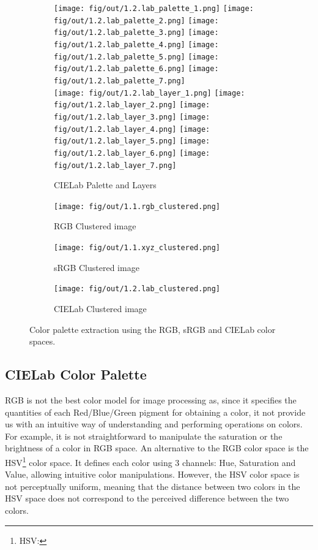 \documentclass[tikz,14pt,fleqn]{article}
\begin{document}
\begin{figure}[h!]
    \begin{subfigure}[]{\linewidth}
        \centering
        \texttt{[image: fig/out/1.2.lab\_palette\_1.png]}
        \texttt{[image: fig/out/1.2.lab\_palette\_2.png]}
        \texttt{[image: fig/out/1.2.lab\_palette\_3.png]}
        \texttt{[image: fig/out/1.2.lab\_palette\_4.png]}
        \texttt{[image: fig/out/1.2.lab\_palette\_5.png]}
        \texttt{[image: fig/out/1.2.lab\_palette\_6.png]}
        \texttt{[image: fig/out/1.2.lab\_palette\_7.png]}\\
        \texttt{[image: fig/out/1.2.lab\_layer\_1.png]}
        \texttt{[image: fig/out/1.2.lab\_layer\_2.png]}
        \texttt{[image: fig/out/1.2.lab\_layer\_3.png]}
        \texttt{[image: fig/out/1.2.lab\_layer\_4.png]}
        \texttt{[image: fig/out/1.2.lab\_layer\_5.png]}
        \texttt{[image: fig/out/1.2.lab\_layer\_6.png]}
        \texttt{[image: fig/out/1.2.lab\_layer\_7.png]}
        \caption{CIELab Palette and Layers}
        \label{fig:1.2.cielab_palette_layers}
    \end{subfigure}
    \begin{subfigure}[]{0.25\linewidth}
        \texttt{[image: fig/out/1.1.rgb\_clustered.png]}
        \caption{RGB Clustered image}
        \label{fig:1.1.rgb_clustered}
    \end{subfigure}
    \begin{subfigure}[]{0.25\linewidth}
        \texttt{[image: fig/out/1.1.xyz\_clustered.png]}
        \caption{sRGB Clustered image}
        \label{fig:1.1.srgb_clustered}
    \end{subfigure}
    \begin{subfigure}[]{0.25\linewidth}
        \texttt{[image: fig/out/1.2.lab\_clustered.png]}
        \caption{CIELab Clustered image}
        \label{fig:1.2.cielab_clustered}
    \end{subfigure}
    \caption{Color palette extraction using the RGB, sRGB and CIELab color spaces.}
\end{figure}


\subsection{CIELab Color Palette}
RGB is not the best color model for image processing as, since it specifies the quantities of each Red/Blue/Green pigment for obtaining a color, it not provide us with an intuitive way of understanding and performing operations on colors. For example, it is not straightforward to manipulate the saturation or the brightness of a color in RGB space. An alternative to the RGB color space is the HSV\footnote{HSV: } color space. It defines each color using 3 channels: Hue, Saturation and Value, allowing intuitive color manipulations. However, the HSV color space is not perceptually uniform, meaning that the distance between two colors in the HSV space does not correspond to the perceived difference between the two colors.
\end{document}
